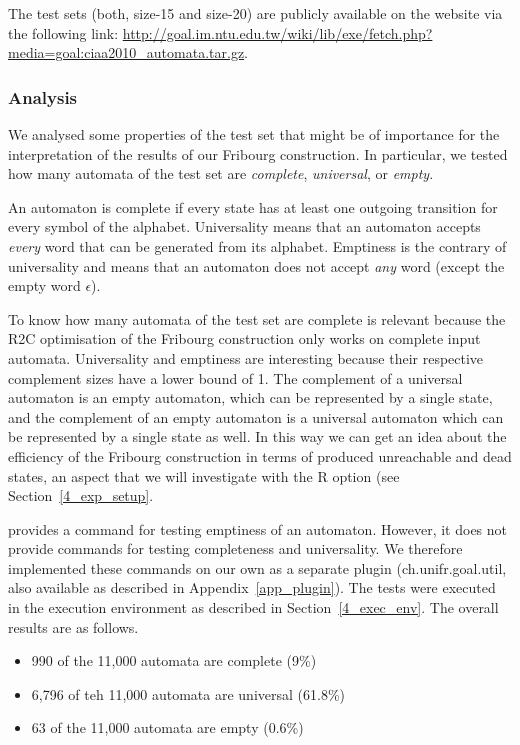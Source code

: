 The \goal{} test sets (both, size-15 and size-20) are publicly available on the \goal{} website via the following link: \url{http://goal.im.ntu.edu.tw/wiki/lib/exe/fetch.php?media=goal:ciaa2010_automata.tar.gz}.

\subsubsection{Analysis}

We analysed some properties of the \goal{} test set that might be of importance for the interpretation of the results of our Fribourg construction. In particular, we tested how many automata of the \goal{} test set are \textit{complete}, \textit{universal}, or \textit{empty}.

An automaton is complete if every state has at least one outgoing transition for every symbol of the alphabet. Universality means that an automaton accepts \textit{every} word that can be generated from its alphabet. Emptiness is the contrary of universality and means that an automaton does not accept \textit{any} word (except the empty word $\epsilon$).

To know how many automata of the test set are complete is relevant because the R2C optimisation of the Fribourg construction only works on complete input automata. Universality and emptiness are interesting because their respective complement sizes have a lower bound of 1. The complement of a universal automaton is an empty automaton, which can be represented by a single state, and the complement of an empty automaton is a universal automaton which can be represented by a single state as well. In this way we can get an idea about the efficiency of the Fribourg construction in terms of produced unreachable and dead states, an aspect that we will investigate with the R option (see Section~\ref{4_exp_setup}.

\goal{} provides a command for testing emptiness of an automaton. However, it does not provide commands for testing completeness and universality. We therefore implemented these commands on our own as a separate \goal{} plugin (\textsf{ch.unifr.goal.util}, also available as described in Appendix~\ref{app_plugin}). The tests were executed in the execution environment as described in Section~\ref{4_exec_env}. The overall results are as follows.

\begin{itemize}
\item 990 of the 11,000 automata are complete (9\%)
\item 6,796 of teh 11,000 automata are universal (61.8\%)
\item 63 of the 11,000 automata are empty (0.6\%)
\end{itemize}


